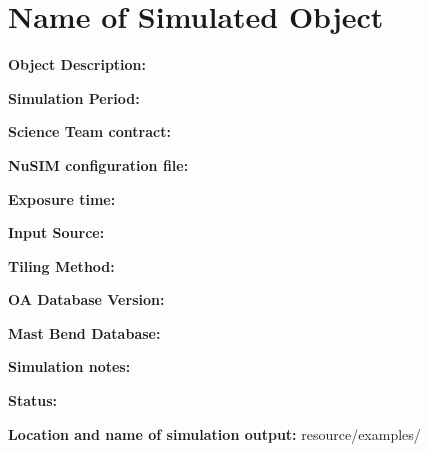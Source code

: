 
\newpage

\section{Name of Simulated Object}

\textbf{Object Description:}

\textbf{Simulation Period:} 

\textbf{Science Team contract:} 

\textbf{NuSIM configuration file:}

\textbf{Exposure time:}

\textbf{Input Source:} 

\textbf{Tiling Method:}

\textbf{OA Database Version:} 

\textbf{Mast Bend Database:} 

\textbf{Simulation notes:} 

\textbf{Status:} 

\textbf{Location and name of simulation output:} resource/examples/


